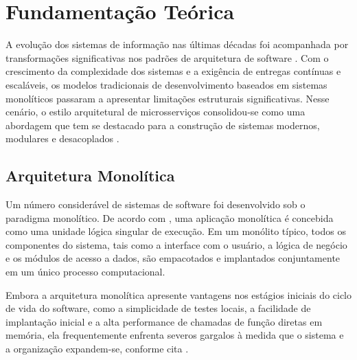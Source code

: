 

\chapter{Fundamentação Teórica}

A evolução dos sistemas de informação nas últimas décadas foi acompanhada por transformações significativas nos padrões de arquitetura de software \cite{velepucha2023}.
Com o crescimento da complexidade dos sistemas e a exigência de entregas contínuas e escaláveis, os modelos tradicionais de desenvolvimento baseados em sistemas monolíticos passaram a apresentar limitações estruturais significativas. Nesse cenário, o estilo arquitetural de microsserviços consolidou-se como uma abordagem que tem se destacado para a construção de sistemas modernos, modulares e desacoplados \cite{newman2020}.

\section{Arquitetura Monolítica}

Um número considerável de sistemas de software foi desenvolvido sob o paradigma monolítico. De acordo com \textcite{richardson2018}, uma aplicação monolítica é concebida como uma unidade lógica singular de execução. Em um monólito típico, todos os componentes do sistema, tais como a interface com o usuário, a lógica de negócio e os módulos de acesso a dados, são empacotados e implantados conjuntamente em um único processo computacional.

Embora a arquitetura monolítica apresente vantagens nos estágios iniciais do ciclo de vida do software, como a simplicidade de testes locais, a facilidade de implantação inicial e a alta performance de chamadas de função diretas em memória, ela frequentemente enfrenta severos gargalos à medida que o sistema e a organização expandem-se, conforme cita \cite{newman2021}.

